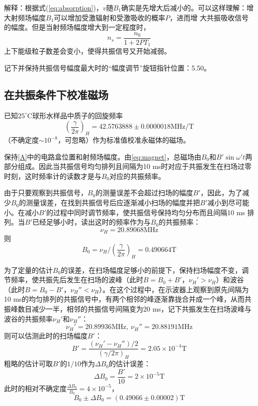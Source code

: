 \documentclass[aps,pre,12pt,preprint,onecolumn,showpacs,showkeys]{revtex4-1}
\def \degree {^\circ}
\begin{document}
解释：根据式(\ref{eq:absorption})，$v$随$B_1$确实是先增大后减小的。可以这样理解：增大射频场幅度$B_1$可以增加受激辐射和受激吸收的概率$P$，进而增
大共振吸收信号的幅度。但是当射频场幅度增大到一定程度时，
\begin{equation}
n_s =\frac{n_0}{1+2PT_1}\label{eq:saturate}
\end{equation}
上下能级粒子数差会变小，使得共振信号又开始减弱。

记下并保持共振信号幅度最大时的“幅度调节”旋钮指针位置：5.50。
\subsection{在共振条件下校准磁场}\label{B}
已知$25\degree\mathrm{C}$球形水样品中质子的回旋频率
\begin{equation}
\left(\frac{\gamma}{2\pi}\right)_H=42.576 388 8\pm0.000 001 8 \mathrm{MHz/T}
\end{equation}
（不确定度$\sim 10^{-8}$，可忽略）作为标准值校准永磁体的磁场。

保持\ref{A}中的电路盒位置和射频场幅度。由\ref{eq:magnet}，总磁场由$B_0$和$B' \sin \omega' t$两部分组成。因此当共振信号均匀排列且间隔为10 ms时对应于共振发生在扫场过零时刻，这时频率计的读数才是与$B_0$对应的共振频率。

由于只要观察到共振信号，$B_0$的测量误差不会超过扫场的幅度$B'$，因此，为了减少$B_0$的测量误差，在找到共振信号后应逐渐减小扫场的幅度并把$B'$减小到尽可能小。在减小$B'$的过程中同时调节频率，使共振信号保持均匀分布而且间隔10 ms 排列。当$B'$已经足够小时，读出这时的频率作为与$B_0$的共振频率：
\begin{equation}
\nu_H=20.89068 \mathrm{MHz}
\end{equation}
则
\begin{equation}
B_0=\nu_H/\left(\frac{\gamma}{2\pi}\right)_H=0.490664 \mathrm{T}
\end{equation}

为了定量的估计$B_0$的误差，在扫场幅度足够小的前提下，保持扫场幅度不变，调节频率，使共振先后发生在扫场的波峰（此时$B=B_0+B'$，$\nu_H'>\nu_H$）和波谷（此时$B=B_0-B'$，$\nu_H''<\nu_H$）。在这个过程中，在示波器上观察到原先间隔为10 ms的均匀排列的共振信号中，有两个相邻的峰逐渐靠拢合并成一个峰，从而共振峰数目减少一半，相邻的共振信号间隔变为20 ms，记下共振发生在扫场波峰与波谷的共振频率$\nu_H'$和$\nu_H''$：
\begin{equation}
\nu_H'=20.89936\mathrm{MHz},\ \nu_H''=20.88191\mathrm{MHz}
\end{equation}
则可以估测此时的扫场幅度$B'$：
\begin{equation}
B'=\frac{(\nu_H'-\nu_H'')/2}{(\gamma/2\pi)_H}=2.05\times 10^{-4} \mathrm{T}
\end{equation}
粗略的估计可取$B'$的$1/10$作为$\Delta B_0$的估计误差：
\begin{equation}
\Delta B_0=\frac{B'}{10}=2\times 10 ^{-5} \mathrm{T}
\end{equation}
此时的相对不确定度$\frac{\Delta B_0}{B_0}=4\times 10 ^{-5}$，
\begin{equation}
B_0\pm \Delta B_0 =(0.49066 \pm 0.00002 ) \mathrm{T}
\end{equation}
\end{document}
